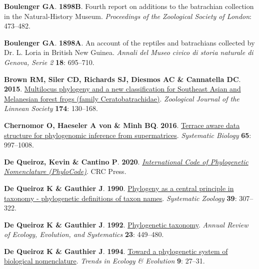 \documentclass[
  letterpaper,
  DIV=11,
  numbers=noendperiod]{scrartcl}
\newlength{\cslhangindent}
\newenvironment{CSLReferences}[2] %
 {\begin{list}{}{%
  \setlength{\itemindent}{0pt}
  \setlength{\leftmargin}{0pt}
  \setlength{\parsep}{0pt}
  \ifodd #1
   \setlength{\leftmargin}{\cslhangindent}
   \setlength{\itemindent}{-1\cslhangindent}
  \fi
  \setlength{\itemsep}{#2\baselineskip}}}
 {\end{list}}
\begin{document}
\begin{CSLReferences}{0}{1}
\textbf{\textbf{Boulenger GA}}. \textbf{1898B}. {Fourth report on
additions to the batrachian collection in the Natural-History Museum}.
\emph{Proceedings of the Zoological Society of London}: 473--482.

\textbf{\textbf{Boulenger GA}}. \textbf{1898A}. {An account of the
reptiles and batrachians collected by Dr. L. Loria in British New
Guinea}. \emph{Annali del Museo civico di storia naturale di Genova,
Serie 2} \textbf{18}: 695--710.

\textbf{\textbf{Brown RM}, \textbf{Siler CD}, \textbf{Richards SJ},
\textbf{Diesmos AC} \& \textbf{Cannatella DC}}. \textbf{2015}.
\href{https://doi.org/10.1111/zoj.12232}{{Multilocus phylogeny and a new
classification for Southeast Asian and Melanesian forest frogs (family
Ceratobatrachidae)}}. \emph{Zoological Journal of the Linnean Society}
\textbf{174}: 130--168.

\textbf{\textbf{Chernomor O}, \textbf{Haeseler A von} \& \textbf{Minh
BQ}}. \textbf{2016}.
\href{https://doi.org/10.1093/sysbio/syw037}{Terrace aware data
structure for phylogenomic inference from supermatrices}.
\emph{Systematic Biology} \textbf{65}: 997--1008.

\textbf{\textbf{De Queiroz, Kevin} \& \textbf{Cantino P}}.
\textbf{2020}.
\emph{\href{https://doi.org/10.1201/9780429446320}{{International Code
of Phylogenetic Nomenclature (PhyloCode)}}}. CRC Press.

\textbf{\textbf{De Queiroz K} \& \textbf{Gauthier J}}. \textbf{1990}.
\href{https://doi.org/10.2307/2992353}{{Phylogeny as a central principle
in taxonomy - phylogenetic definitions of taxon names}}.
\emph{Systematic Zoology} \textbf{39}: 307--322.

\textbf{\textbf{De Queiroz K} \& \textbf{Gauthier J}}. \textbf{1992}.
\href{https://doi.org/10.1146/annurev.ecolsys.23.1.449}{{Phylogenetic
taxonomy}}. \emph{{Annual Review of Ecology, Evolution, and
Systematics}} \textbf{23}: 449--480.

\textbf{\textbf{De Queiroz K} \& \textbf{Gauthier J}}. \textbf{1994}.
\href{https://doi.org/10.1016/0169-5347(94)90231-3}{{Toward a
phylogenetic system of biological nomenclature}}. \emph{{Trends in
Ecology \& Evolution}} \textbf{9}: 27--31.


\end{CSLReferences}
\end{document}
